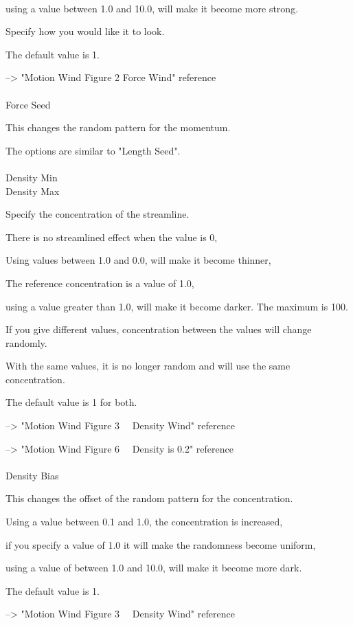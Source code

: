 \documentclass[a4paper,12pt]{article}
\begin{document}
\ \vspace{-0.2em}
\par
using a value between 1.0 and 10.0, will make it become more strong.\par
Specify how you would like it to look.\par
The default value is 1.\par
--> "Motion Wind Figure 2 Force Wind" reference\\
\\
Force Seed\par
This changes the random pattern for the momentum.\par
The options are similar to "Length Seed".\\
\\
Density Min\\
Density Max\par
Specify the concentration of the streamline.\par
There is no streamlined effect when the value is 0,\par
Using values between 1.0 and 0.0, will make it become thinner,\par
The reference concentration is a value of 1.0,\par
using a value greater than 1.0, will make it become darker. The maximum is 100.\par
If you give different values, concentration between the values will change randomly.\par
With the same values, it is no longer random and will use the same concentration.\par
The default value is 1 for both.\par
--> "Motion Wind Figure 3 \ \ Density Wind" reference\par
--> "Motion Wind Figure 6 \ \ Density is 0.2" reference\\
\\
Density Bias\par
This changes the offset of the random pattern for the concentration.\par
Using a value between 0.1 and 1.0, the concentration is increased,\par
if you specify a value of 1.0 it will make the randomness become uniform,\par
using a value of between 1.0 and 10.0, will make it become more dark.\par
The default value is 1.\par
--> "Motion Wind Figure 3 \ \ Density Wind" reference\\
\end{document}

